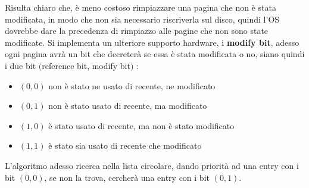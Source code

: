 \documentclass[12pt, letterpaper]{article}
\begin{document}
Risulta chiaro che, è meno costoso rimpiazzare una pagina che non è stata modificata, in modo che non sia necessario riscriverla 
sul disco, quindi l'OS dovrebbe dare la precedenza di rimpiazzo alle pagine che non sono state modificate. Si 
implementa un ulteriore supporto hardware, i \textbf{modify bit}, adesso ogni pagina avrà un bit che decreterà se 
essa è stata modificata o no, siano quindi i due bit \((\)reference bit, modify bit\()\) : \begin{itemize}
    \item \((0,0)\) non è stato ne usato di recente, ne modificato
    \item \((0,1)\) non è stato  usato di recente, ma modificato
    \item \((1,0)\) è stato usato di recente, ma non è stato modificato
    \item \((1,1)\) è stato sia usato di recente che modificato
\end{itemize}
L'algoritmo adesso ricerca nella lista circolare, dando priorità ad una entry con i bit \((0,0)\), se non 
la trova, cercherà una entry con i bit \((0,1)\).
\end{document}

